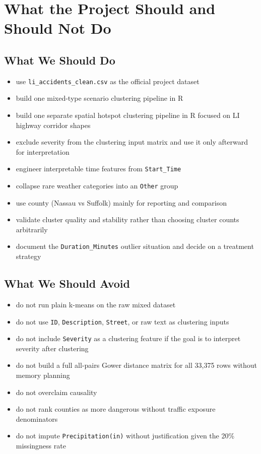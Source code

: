 \documentclass[11pt]{article}
\begin{document}
\section{What the Project Should and Should Not Do}

\subsection{What We Should Do}

\begin{itemize}
\item use \texttt{li\_accidents\_clean.csv} as the official project dataset
\item build one mixed-type scenario clustering pipeline in R
\item build one separate spatial hotspot clustering pipeline in R focused on LI highway corridor shapes
\item exclude severity from the clustering input matrix and use it only afterward for interpretation
\item engineer interpretable time features from \texttt{Start\_Time}
\item collapse rare weather categories into an \texttt{Other} group
\item use county (Nassau vs Suffolk) mainly for reporting and comparison
\item validate cluster quality and stability rather than choosing cluster counts arbitrarily
\item document the \texttt{Duration\_Minutes} outlier situation and decide on a treatment strategy
\end{itemize}

\subsection{What We Should Avoid}

\begin{itemize}
\item do not run plain k-means on the raw mixed dataset
\item do not use \texttt{ID}, \texttt{Description}, \texttt{Street}, or raw text as clustering inputs
\item do not include \texttt{Severity} as a clustering feature if the goal is to interpret severity after clustering
\item do not build a full all-pairs Gower distance matrix for all 33,375 rows without memory planning
\item do not overclaim causality
\item do not rank counties as more dangerous without traffic exposure denominators
\item do not impute \texttt{Precipitation(in)} without justification given the 20\% missingness rate
\end{itemize}
\end{document}

